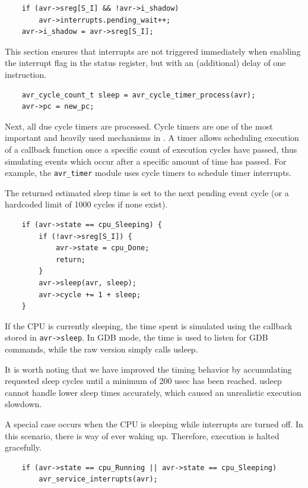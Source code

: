 \begin{lstlisting}
    if (avr->sreg[S_I] && !avr->i_shadow)
        avr->interrupts.pending_wait++;
    avr->i_shadow = avr->sreg[S_I];
\end{lstlisting}

This section ensures that interrupts are not triggered immediately when
enabling the interrupt flag in the status register, but with an (additional)
delay of one instruction.

\begin{lstlisting}
    avr_cycle_count_t sleep = avr_cycle_timer_process(avr);
    avr->pc = new_pc;
\end{lstlisting}

Next, all due cycle timers are processed. Cycle timers are one of the
most important and heavily used mechanisms in \simavr. A timer allows scheduling
execution of a callback function once a specific count of execution cycles have
passed, thus simulating events which occur after a specific amount of time has
passed. For example, the \lstinline|avr_timer| module uses cycle timers to schedule timer
interrupts.

The returned estimated sleep time is set to the next pending event cycle (or a
hardcoded limit of 1000 cycles if none exist).

\begin{lstlisting}
    if (avr->state == cpu_Sleeping) {
        if (!avr->sreg[S_I]) {
            avr->state = cpu_Done;
            return;
        }
        avr->sleep(avr, sleep);
        avr->cycle += 1 + sleep;
    }
\end{lstlisting}

If the \ac{CPU} is currently sleeping, the time spent is simulated using the callback
stored in \lstinline|avr->sleep|. In \ac{GDB} mode, the time is used to listen for
\ac{GDB} commands, while the raw version simply calls usleep.

It is worth noting that
we have improved the timing behavior by accumulating requested sleep cycles until
a minimum of 200 usec has been reached. usleep cannot handle lower sleep times
accurately, which caused an unrealistic execution slowdown.

A special case occurs when the \ac{CPU} is sleeping while interrupts are turned off.
In this scenario, there is way of ever waking up. Therefore, execution is halted
gracefully.

\begin{lstlisting}
    if (avr->state == cpu_Running || avr->state == cpu_Sleeping)
        avr_service_interrupts(avr);
\end{lstlisting}

